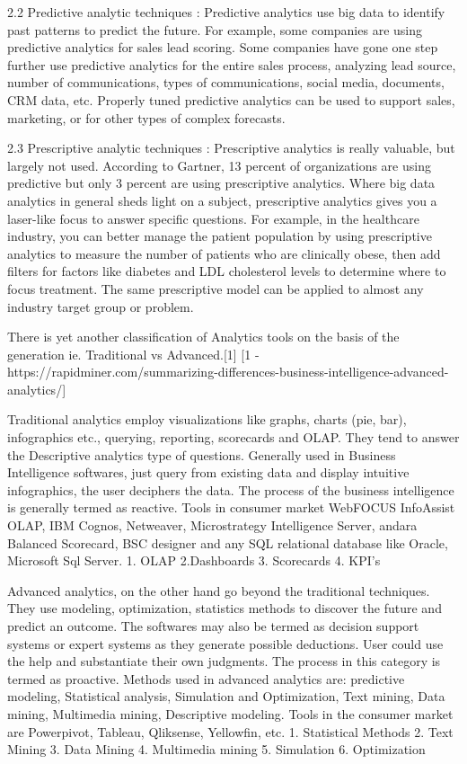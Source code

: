 2.2 Predictive analytic techniques : Predictive analytics use big data to identify past patterns to predict the future. For example, some companies are using predictive analytics for sales lead scoring. Some companies have gone one step further use predictive analytics for the entire sales process, analyzing lead source, number of communications, types of communications, social media, documents, CRM data, etc. Properly tuned predictive analytics can be used to support sales, marketing, or for other types of complex forecasts.


2.3 Prescriptive analytic techniques : Prescriptive analytics is really valuable, but largely not used. According to Gartner, 13 percent of organizations are using predictive but only 3 percent are using prescriptive analytics. Where big data analytics in general sheds light on a subject, prescriptive analytics gives you a laser-like focus to answer specific questions. For example, in the healthcare industry, you can better manage the patient population by using prescriptive analytics to measure the number of patients who are clinically obese, then add filters for factors like diabetes and LDL cholesterol levels to determine where to focus treatment. The same prescriptive model can be applied to almost any industry target group or problem.


There is yet another classification of Analytics tools on the basis of the generation ie. Traditional vs Advanced.[1] [1 - https://rapidminer.com/summarizing-differences-business-intelligence-advanced-analytics/]

Traditional analytics employ visualizations like graphs, charts (pie, bar), infographics etc., querying, reporting, scorecards and OLAP. They tend to answer the Descriptive analytics type of questions. Generally used in Business Intelligence softwares, just query from existing data and display intuitive infographics, the user deciphers the data. The process of the business intelligence is generally termed as reactive.
Tools in consumer market WebFOCUS InfoAssist OLAP, IBM Cognos, Netweaver, Microstrategy Intelligence Server, andara Balanced Scorecard, BSC designer and any SQL relational database like Oracle, Microsoft Sql Server.
1. OLAP
2.Dashboards
3. Scorecards
4. KPI’s

Advanced analytics, on the other hand go beyond the traditional techniques. They use modeling, optimization, statistics methods to discover the future and predict an outcome. The softwares may also be termed as decision support systems or expert systems as they generate possible deductions. User could use the help and substantiate their own judgments. The process in this category is termed as proactive.
Methods used in advanced analytics are: predictive modeling, Statistical analysis, Simulation and Optimization, Text mining, Data mining, Multimedia mining, Descriptive modeling.
Tools in the consumer market are Powerpivot, Tableau, Qliksense, Yellowfin, etc.
1. Statistical Methods
2. Text Mining
3. Data Mining
4. Multimedia mining
5. Simulation
6. Optimization



